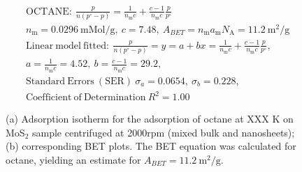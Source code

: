 

\begin{align*}
&\mathrm{OCTANE:}\ \frac{p}{n(p^\circ-p)}=\frac{1}{n_\mathrm{m}c}+\frac{c-1}{n_\mathrm{m}c}\frac{p}{p^\circ}\\
&{n_\mathrm{m}}=0.0296\ \mathrm{mMol/g},\ c=7.48,\ A_{BET}={n_\mathrm{m}}{a_\mathrm{m}}{N_\mathrm{A}}=11.2\ \mathrm{m}^2\mathrm{/g}\\
&\mathrm{Linear\ model\ fitted:}\ \frac{p}{n(p^\circ-p)}=y=a+bx=\frac{1}{n_\mathrm{m}c}+\frac{c-1}{n_\mathrm{m}c}\frac{p}{p^\circ},\\
&a=\frac{1}{n_\mathrm{m}c}=4.52,\ b=\frac{c-1}{n_\mathrm{m}c}=29.2,\\
&\mathrm{Standard\ Errors\ (SER)}\ \sigma_a=0.0654,\ \sigma_b=0.228,\\
&\mathrm{Coefficient\ of\ Determination}\ R^2 = 1.00
\end{align*}


\begin{figure}[htb]
\hfill
{}
\caption{(a) Adsorption isotherm for the adsorption of octane at XXX K on MoS$_2$ 
sample centrifuged at 2000rpm (mixed bulk and nanosheets);
(b) corresponding BET plots. The BET equation was calculated for octane, yielding an estimate for $A_{BET}=11.2\ \mathrm{m}^2\mathrm{/g}$.}

\label{fig:sa-Reference-As-Supplied-13mg-2mm-30C-S1-SA-10ml}
\end{figure}


